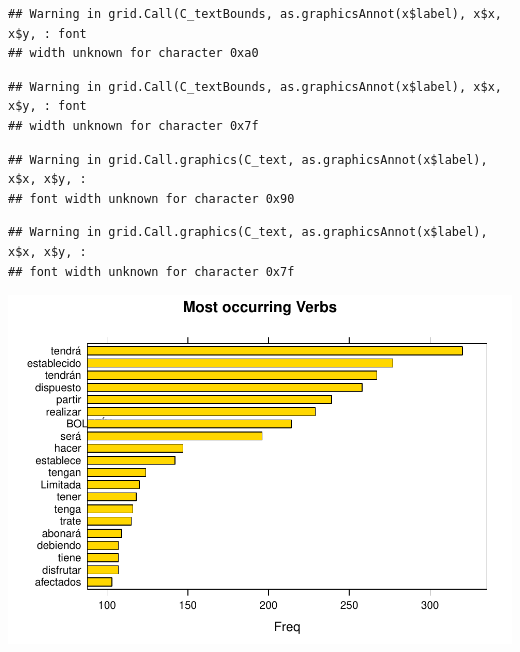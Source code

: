 \documentclass[]{article}
\newenvironment{Shaded}{\begin{snugshade}}{\end{snugshade}}
\newcommand{\CommentTok}[1]{\textcolor[rgb]{0.56,0.35,0.01}{\textit{#1}}}
\newcommand{\DataTypeTok}[1]{\textcolor[rgb]{0.13,0.29,0.53}{#1}}
\newcommand{\DecValTok}[1]{\textcolor[rgb]{0.00,0.00,0.81}{#1}}
\newcommand{\KeywordTok}[1]{\textcolor[rgb]{0.13,0.29,0.53}{\textbf{#1}}}
\newcommand{\NormalTok}[1]{#1}
\newcommand{\OperatorTok}[1]{\textcolor[rgb]{0.81,0.36,0.00}{\textbf{#1}}}
\newcommand{\StringTok}[1]{\textcolor[rgb]{0.31,0.60,0.02}{#1}}
\begin{document}
\begin{verbatim}
## Warning in grid.Call(C_textBounds, as.graphicsAnnot(x$label), x$x, x$y, : font
## width unknown for character 0xa0
\end{verbatim}

\begin{verbatim}
## Warning in grid.Call(C_textBounds, as.graphicsAnnot(x$label), x$x, x$y, : font
## width unknown for character 0x7f
\end{verbatim}

\begin{verbatim}
## Warning in grid.Call.graphics(C_text, as.graphicsAnnot(x$label), x$x, x$y, :
## font width unknown for character 0x90
\end{verbatim}

\begin{verbatim}
## Warning in grid.Call.graphics(C_text, as.graphicsAnnot(x$label), x$x, x$y, :
## font width unknown for character 0x7f
\end{verbatim}

\includegraphics{TFM_files/figure-latex/unnamed-chunk-6-1.pdf}

\begin{Shaded}
\end{Shaded}
\end{document}
